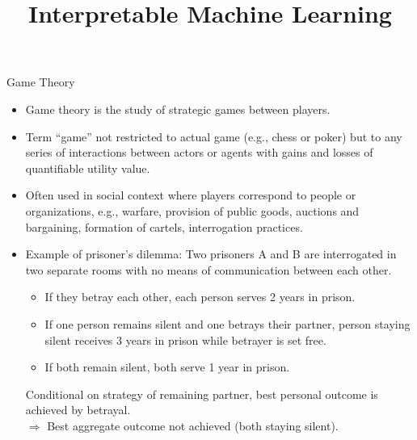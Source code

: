 \documentclass[11pt,compress,t,notes=noshow, aspectratio=169, xcolor=table]{beamer}
\title{Interpretable Machine Learning}
\date{}
\begin{document}
\newcommand{\learninggoals}{%
\item Learn what game theory is.
\item Understand the concept behind cooperative games.
\item Understand the Shapley value in game theory.
}




\begin{vbframe}{Game Theory}
\begin{itemize}
\itemsep1em
  \item Game theory is the study of strategic games between players.
  \item Term \enquote{game} not restricted to actual game (e.g., chess or poker) but to any series of interactions between actors or agents with gains and losses of quantifiable utility value.
  \item Often used in social context where players correspond to people or organizations, e.g., warfare, provision of public goods, auctions and bargaining, formation of cartels, interrogation practices.
  \item Example of prisoner's dilemma: Two prisoners A and B are interrogated in two separate rooms with no means of communication between each other.
    \begin{itemize}
        \item If they betray each other, each person serves 2 years in prison.
        \item If one person remains silent and one betrays their partner, person staying silent receives 3 years in prison while betrayer is set free.
        \item If both remain silent, both serve 1 year in prison.
    \end{itemize}
    Conditional on strategy of remaining partner, best personal outcome is achieved by betrayal.
    \\
    $\Rightarrow$ Best aggregate outcome not achieved (both staying silent). 
\end{itemize}
\end{vbframe}
\end{document}
